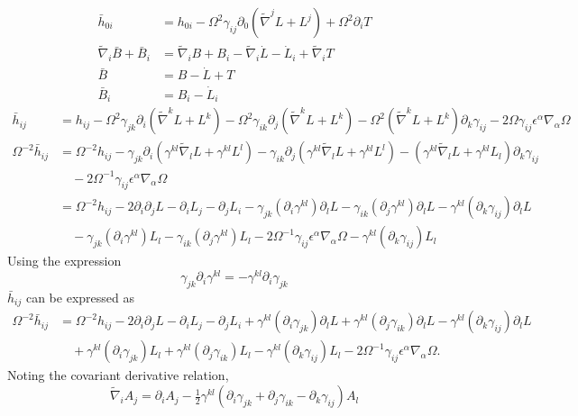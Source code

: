 \documentclass[10pt,letterpaper]{article}
\begin{document}
\begin{align}
	 \bar h_{0i} &=  h_{0i} -\Omega^2 \gamma_{ij} \partial_0 (\tilde\nabla^j L + L^j) + \Omega^2 \partial_i T\\
	\tilde \nabla_i \bar B + \bar B_i &= \tilde\nabla_i B + B_i - \tilde\nabla_i \dot L - \dot L_i + \tilde\nabla_i T\\
	\bar B &= B - \dot L + T\\
	\bar B_i &= B_i - \dot L_i
\end{align}
\begin{align}
	 \bar h_{ij} &=  h_{ij} -\Omega^2 \gamma_{jk}\partial_i(\tilde\nabla^k L + L^k) - \Omega^2 \gamma_{ik} \partial_j (\tilde\nabla^k L + L^k)
	- \Omega^2 (\tilde\nabla^k L +L^k)\partial_k \gamma_{ij}-2\Omega \gamma_{ij}  \epsilon^\alpha \nabla_\alpha \Omega\\
	\Omega^{-2}\bar h_{ij} &=\Omega^{-2}h_{ij} - \gamma_{jk}\partial_i(\gamma^{kl}\tilde\nabla_l L + \gamma^{kl}L^l) - \gamma_{ik} \partial_j (\gamma^{kl}\tilde\nabla_l L + \gamma^{kl}L^l)
	- (\gamma^{kl}\tilde\nabla_l L +\gamma^{kl}L_l)\partial_k \gamma_{ij}\nonumber\\
	&\quad -2\Omega^{-1} \gamma_{ij}  \epsilon^\alpha \nabla_\alpha \Omega\\
	&= \Omega^{-2} h_{ij} -2 \partial_i \partial_j L - \partial_i L_j -\partial_j L_i - \gamma_{jk} (\partial_i \gamma^{kl})\partial_l L- \gamma_{ik}( \partial_j \gamma^{kl})\partial_l L
	-\gamma^{kl}(\partial_k \gamma_{ij})\partial_l L\nonumber\\
	&\quad - \gamma_{jk} (\partial_i \gamma^{kl})L_l- \gamma_{ik}( \partial_j \gamma^{kl})L_l  -2\Omega^{-1} \gamma_{ij}  \epsilon^\alpha \nabla_\alpha \Omega
	-\gamma^{kl}(\partial_k \gamma_{ij})L_l
\end{align}
Using the expression
\[
	\gamma_{jk}\partial_i \gamma^{kl} = -\gamma^{kl}\partial_i \gamma_{jk} 
\]
$\bar h_{ij}$ can be expressed as
\begin{align}
	\Omega^{-2}\bar h_{ij}&= \Omega^{-2} h_{ij} -2 \partial_i \partial_j L - \partial_i L_j -\partial_j L_i + \gamma^{kl} (\partial_i \gamma_{jk})\partial_l L+ \gamma^{kl}( \partial_j \gamma_{ik})\partial_l L
	-\gamma^{kl}(\partial_k \gamma_{ij})\partial_l L\\
	&\quad + \gamma^{kl} (\partial_i \gamma_{jk})L_l+ \gamma^{kl}( \partial_j \gamma_{ik})L_l-\gamma^{kl}(\partial_k \gamma_{ij})L_l
	 -2\Omega^{-1} \gamma_{ij}  \epsilon^\alpha \nabla_\alpha \Omega.
\end{align}
Noting the covariant derivative relation,
\begin{equation}
	\tilde\nabla_i A_j = \partial_i A_j -\tfrac12 \gamma^{kl}(\partial_i \gamma_{jk} + \partial_{j}\gamma_{ik} - \partial_k \gamma_{ij})A_l
\end{equation}
\end{document}
